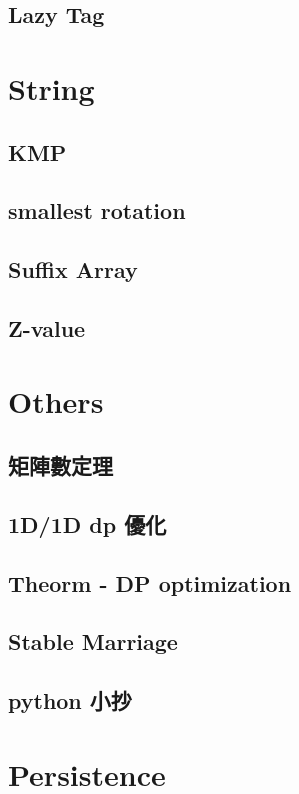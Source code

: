 \subsection{Lazy Tag}




\section{String}

\subsection{KMP}

\subsection{smallest rotation}

\subsection{Suffix Array}

\subsection{Z-value}


\section{Others}

\subsection{矩陣數定理}

\subsection{1D/1D dp 優化}

\subsection{Theorm - DP optimization}

\subsection{Stable Marriage}

\subsection{python 小抄}



\section{Persistence}

